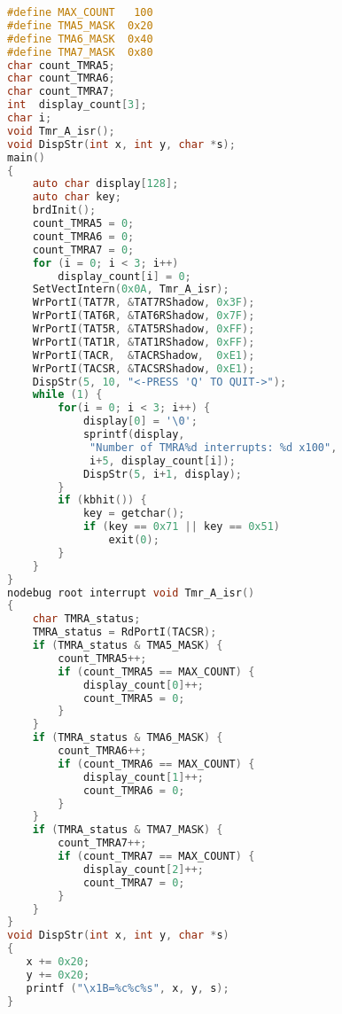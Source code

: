 \begin{lstlisting}[language=C, caption=Modified code LAB2A.c.]
#define MAX_COUNT   100
#define TMA5_MASK  0x20
#define TMA6_MASK  0x40
#define TMA7_MASK  0x80
char count_TMRA5;
char count_TMRA6;
char count_TMRA7;
int  display_count[3];
char i;
void Tmr_A_isr();
void DispStr(int x, int y, char *s);
main()
{
    auto char display[128];
    auto char key;
    brdInit();
    count_TMRA5 = 0;
    count_TMRA6 = 0;
    count_TMRA7 = 0;
    for (i = 0; i < 3; i++)
        display_count[i] = 0;
    SetVectIntern(0x0A, Tmr_A_isr);
    WrPortI(TAT7R, &TAT7RShadow, 0x3F);
    WrPortI(TAT6R, &TAT6RShadow, 0x7F);
    WrPortI(TAT5R, &TAT5RShadow, 0xFF);
    WrPortI(TAT1R, &TAT1RShadow, 0xFF);
    WrPortI(TACR,  &TACRShadow,  0xE1);
    WrPortI(TACSR, &TACSRShadow, 0xE1);
    DispStr(5, 10, "<-PRESS 'Q' TO QUIT->");
    while (1) {
        for(i = 0; i < 3; i++) {
            display[0] = '\0';
            sprintf(display, 
             "Number of TMRA%d interrupts: %d x100",
             i+5, display_count[i]);
            DispStr(5, i+1, display);
        }
        if (kbhit()) {
            key = getchar();
            if (key == 0x71 || key == 0x51)
                exit(0);
        }
    }
}
nodebug root interrupt void Tmr_A_isr()
{
    char TMRA_status;
    TMRA_status = RdPortI(TACSR);
    if (TMRA_status & TMA5_MASK) {
        count_TMRA5++;
        if (count_TMRA5 == MAX_COUNT) {
            display_count[0]++;
            count_TMRA5 = 0;
        }
    }
    if (TMRA_status & TMA6_MASK) {
        count_TMRA6++;
        if (count_TMRA6 == MAX_COUNT) {
            display_count[1]++;
            count_TMRA6 = 0;
        }
    }
    if (TMRA_status & TMA7_MASK) {
        count_TMRA7++;
        if (count_TMRA7 == MAX_COUNT) {
            display_count[2]++;
            count_TMRA7 = 0;
        }
    }
}
void DispStr(int x, int y, char *s)
{
   x += 0x20;
   y += 0x20;
   printf ("\x1B=%c%c%s", x, y, s);
}
\end{lstlisting}